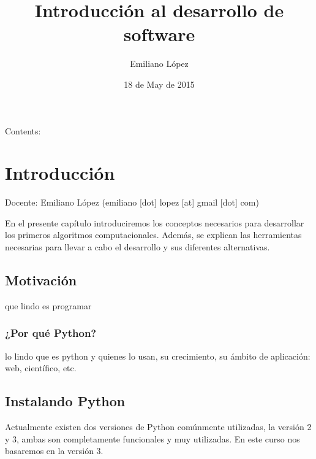 \documentclass[letterpaper,10pt,spanish]{sphinxmanual}
\title{Introducción al desarrollo de software}
\date{18 de May de 2015}
\author{Emiliano López}
\begin{document}
\maketitle
\tableofcontents
{}\label{index::doc}


Contents:


\chapter{Introducción}
\label{Unidad01:introduccion}\label{Unidad01::doc}\label{Unidad01:introduccion-al-desarrollo-de-software}
Docente: Emiliano López (emiliano {[}dot{]} lopez {[}at{]} gmail {[}dot{]} com)

En el presente capítulo introduciremos los conceptos necesarios para
desarrollar los primeros algoritmos computacionales. Además, se explican
las herramientas necesarias para llevar a cabo el desarrollo y sus
diferentes alternativas.


\section{Motivación}
\label{Unidad01:motivacion}
que lindo es programar


\subsection{¿Por qué Python?}
\label{Unidad01:por-que-python}
lo lindo que es python y quienes lo usan, su crecimiento, su ámbito de
aplicación: web, científico, etc.


\section{Instalando Python}
\label{Unidad01:instalando-python}
Actualmente existen dos versiones de Python comúnmente utilizadas, la
versión 2 y 3, ambas son completamente funcionales y muy utilizadas. En
este curso nos basaremos en la versión 3.
\end{document}
